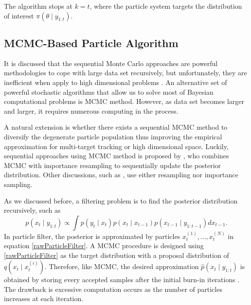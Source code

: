 The algorithm stops at $k=t$, where the particle system targets the distribution of interest $\pi(\theta\mid y_{1:t})$. 


\subsection{MCMC-Based Particle Algorithm}

It is discussed that the sequential Monte Carlo approaches are powerful methodologies to cope with large data set recursively, but unfortunately, they are inefficient when apply to high dimensional problems \citep{septier2009mcmc}.  An alternative set of powerful stochastic algorithms that allow us to solve most of Bayesian computational problems is MCMC method. However, as data set becomes larger and larger, it requires numerous computing in the process. 

A natural extension is whether there exists a sequential MCMC method to diversify the degenerate particle population thus improving the empirical approximation for multi-target tracking or high dimensional space. Luckily, sequential approaches using MCMC method is proposed by \cite{berzuini1997dynamic}, who combines MCMC with importance resampling to sequentially update the posterior distribution. 
Other discussions, such as \citep{khan2005mcmc, golightly2006bayesian, pang2008models}, use either resampling nor importance sampling. 

As we discussed before, a filtering problem is to find the posterior distribution recursively, such as  
\begin{equation}
p(x_t\mid y_{1:t}) \propto \int p(y_t\mid x_t)p(x_t\mid x_{t-1})p(x_{t-1}\mid y_{1:t-1})dx_{t-1}. 
\end{equation} 
In particle filter, the posterior is approximated by particles $x_t^{(1)},\ldots,x_t^{(N)}$ in equation \eqref{rawParticleFilter}. A MCMC procedure is designed using \eqref{rawParticleFilter} as the target distribution with a proposal distribution of $q\left(x_t\mid x_t^{(i)}\right)$. Therefore, like MCMC, the desired approximation $\hat{p}(x_t\mid y_{1:t})$ is obtained by storing every accepted samples after the initial burn-in iterations \citep{septier2009mcmc}. The drawback is excessive computation occurs as the number of particles increases at each iteration. 

